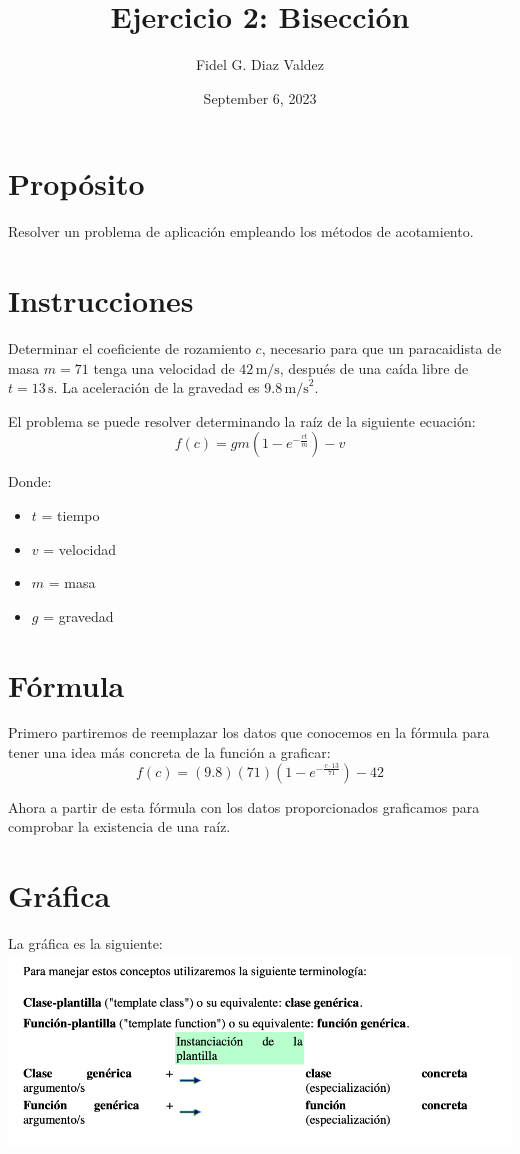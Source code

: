 \documentclass{article}
\title{Ejercicio 2: Bisección}
\author{Fidel G. Diaz Valdez}
\date{September 6, 2023}
\begin{document}
\maketitle

\section{Propósito}
Resolver un problema de aplicación empleando los métodos de acotamiento.

\section{Instrucciones}
Determinar el coeficiente de rozamiento \(c\), necesario para que un paracaidista de masa \(m = 71\) tenga una velocidad de \(42 \, \text{m/s}\), después de una caída libre de \(t = 13 \, \text{s}\). La aceleración de la gravedad es \(9.8 \, \text{m/s}^2\).

El problema se puede resolver determinando la raíz de la siguiente ecuación:
\[f(c) = gm\left(1 - e^{-\frac{ct}{m}}\right) - v\]

Donde:
\begin{itemize}
    \item \(t\) = tiempo
    \item \(v\) = velocidad
    \item \(m\) = masa
    \item \(g\) = gravedad
\end{itemize}

\section{Fórmula}
Primero partiremos de reemplazar los datos que conocemos en la fórmula para tener una idea más concreta de la función a graficar:
\[f(c) = (9.8)(71)\left(1 - e^{-\frac{c \cdot 13}{71}}\right) - 42\]

Ahora a partir de esta fórmula con los datos proporcionados graficamos para comprobar la existencia de una raíz.

\section{Gráfica}
La gráfica es la siguiente:
\\
\includegraphics[scale=0.5]{Grafica.png}
\end{document}
